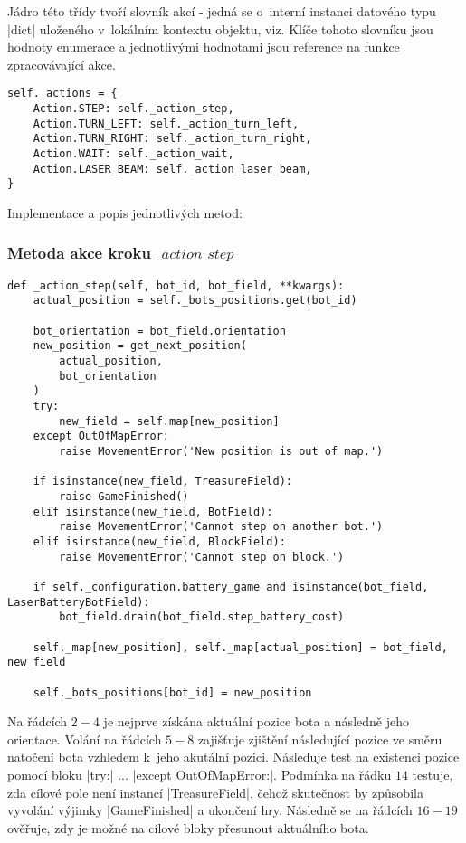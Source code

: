 Jádro této třídy tvoří slovník akcí - jedná se o~interní instanci datového typu \ic|dict| uloženého v~lokálním kontextu objektu, viz. Klíče tohoto slovníku jsou hodnoty enumerace a jednotlivými hodnotami jsou reference na funkce zpracovávající akce.

\begin{lstlisting}[caption={Slovník akcí ve třídě $Game$},label={lst:game-actions}]
self._actions = {
    Action.STEP: self._action_step,
    Action.TURN_LEFT: self._action_turn_left,
    Action.TURN_RIGHT: self._action_turn_right,
    Action.WAIT: self._action_wait,
    Action.LASER_BEAM: self._action_laser_beam,
}	
\end{lstlisting}
Implementace a popis jednotlivých metod:

\subsubsection{Metoda akce kroku $\_action\_step$}
\vspace{-10pt}
\begin{lstlisting}[caption={Metoda $Game.\_action\_step$},label={lst:game-action-step}]
def _action_step(self, bot_id, bot_field, **kwargs):
    actual_position = self._bots_positions.get(bot_id)

    bot_orientation = bot_field.orientation
    new_position = get_next_position(
        actual_position,
        bot_orientation
    )
    try:
        new_field = self.map[new_position]
    except OutOfMapError:
        raise MovementError('New position is out of map.')

    if isinstance(new_field, TreasureField):
        raise GameFinished()
    elif isinstance(new_field, BotField):
        raise MovementError('Cannot step on another bot.')
    elif isinstance(new_field, BlockField):
        raise MovementError('Cannot step on block.')

    if self._configuration.battery_game and isinstance(bot_field, LaserBatteryBotField):
        bot_field.drain(bot_field.step_battery_cost)

    self._map[new_position], self._map[actual_position] = bot_field, new_field

    self._bots_positions[bot_id] = new_position
\end{lstlisting}

Na řádcích $2-4$ je nejprve získána aktuální pozice bota a následně jeho orientace. Volání na řádcích $5-8$ zajišťuje zjištění následující pozice ve směru natočení bota vzhledem k~jeho akutální pozici. Následuje test na existenci pozice pomocí bloku \ic|try:| $...$ \ic|except OutOfMapError:|. Podmínka na řádku $14$ testuje, zda cílové pole není instancí \ic|TreasureField|, čehož skutečnost by způsobila vyvolání výjimky \ic|GameFinished| a ukončení hry. Následně se na řádcích $16-19$ ověřuje, zdy je možné na cílové bloky přesunout aktuálního bota.

